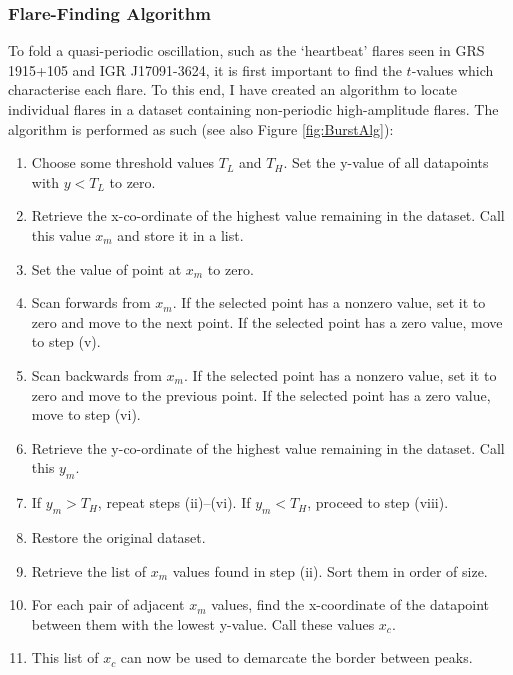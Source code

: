 \subsubsection{Flare-Finding Algorithm}
\label{sec:Flares}

\par To fold a quasi-periodic oscillation, such as the `heartbeat' flares seen in GRS 1915+105 and IGR J17091-3624, it is first important to find the $t$-values which characterise each flare.  To this end, I have created an algorithm to locate individual flares in a dataset containing non-periodic high-amplitude flares. The algorithm is performed as such (see also Figure \ref{fig:BurstAlg}):

\begin{enumerate}
  \item Choose some threshold values $T_L$ and $T_H$.  Set the y-value of all datapoints with $y<T_L$ to zero.
  \item Retrieve the x-co-ordinate of the highest value remaining in the dataset.  Call this value $x_m$ and store it in a list.
  \item Set the value of point at $x_m$ to zero.
  \item Scan forwards from $x_m$.  If the selected point has a nonzero value, set it to zero and move to the next point.  If the selected point has a zero value, move to step (v).
  \item Scan backwards from $x_m$.  If the selected point has a nonzero value, set it to zero and move to the previous point.  If the selected point has a zero value, move to step (vi).
  \item Retrieve the y-co-ordinate of the highest value remaining in the dataset.  Call this $y_m$.
  \item If $y_m>T_H$, repeat steps (ii)--(vi).  If $y_m<T_H$, proceed to step (viii).
  \item Restore the original dataset.
  \item Retrieve the list of $x_m$ values found in step (ii).  Sort them in order of size.
  \item For each pair of adjacent $x_m$ values, find the x-coordinate of the datapoint between them with the lowest y-value.  Call these values $x_c$.
  \item This list of $x_c$ can now be used to demarcate the border between peaks.
\end{enumerate}

